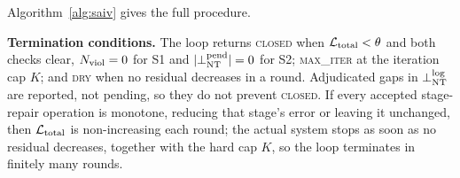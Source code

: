 Algorithm~\ref{alg:saiv} gives the full procedure.



\textbf{Termination conditions.} The loop returns \textsc{closed} when
$\mathcal{L}_{\mathrm{total}} < \theta$ and both checks clear, $N_{\mathrm{viol}} = 0$ for S1 and
$|\bot_{\mathrm{NT}}^{\mathrm{pend}}| = 0$ for S2; \textsc{max\_iter} at the iteration cap $K$; and
\textsc{dry} when no residual decreases in a round. Adjudicated gaps in $\bot_{\mathrm{NT}}^{\mathrm{log}}$
are reported, not pending, so they do not prevent \textsc{closed}. If every
accepted stage-repair operation is monotone, reducing that stage's error or
leaving it unchanged, then $\mathcal{L}_{\mathrm{total}}$ is non-increasing each round; the actual
system stops as soon as no residual decreases, together with the hard cap $K$,
so the loop terminates in finitely many rounds.
\par\endgroup
